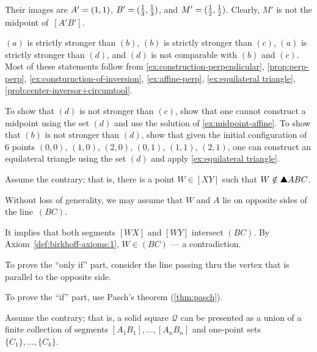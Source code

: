 Their images are $A'=(1,1)$, $B'=(\tfrac13,\tfrac13)$, and $M'=(\tfrac12,\tfrac12)$.
Clearly, $M'$ is not the midpoint of~$[A'B']$.


$(a)$ is strictly stronger than $(b)$,
$(b)$ is strictly stronger than $(c)$,
$(a)$ is strictly stronger than $(d)$,
and $(d)$ is not comparable with $(b)$ and $(c)$.
Most of these statements follow from \ref{ex:construction-perpendicular},
\ref{prop:perp-perp},
\ref{ex:consturuction-of-inversion},
\ref{ex:affine-perp},
\ref{ex:equilateral triangle}, 
\ref{prob:center-inversor+circumtool}.

To show that $(d)$ is not stronger than $(c)$, show that one cannot construct a midpoint using the set $(d)$ and use the solution of \ref{ex:midpoint-affine}.
To show that $(b)$ is not stronger than $(d)$, show that given the initial configuration of 6 points 
$(0,0)$, 
$(1,0)$,
$(2,0)$,
$(0,1)$, 
$(1,1)$,
$(2,1)$,
one can construct an equilateral triangle using the set $(d)$ and apply \ref{ex:equilateral triangle}.

\setcounter{eqtn}{0} 

Assume the contrary; 
that is, there is a point $W\in [XY]$ such that $W\notin\solidtriangle ABC$.

Without  loss of generality, we may assume that $W$ and $A$ lie on opposite sides of the line~$(BC)$.

It implies that both segments $[WX]$ and $[WY]$ intersect $(BC)$.
By Axiom~\ref{def:birkhoff-axioms:1}, $W\in (BC)$ --- a contradiction.


To prove the ``only if'' part, consider the line passing thru the vertex that is parallel to the opposite side.

To prove the ``if'' part, use Pasch's theorem (\ref{thm:pasch}).

Assume the contrary; that is, a solid square $\mathcal{Q}$ can be presented as a union of a finite collection of segments $[A_1B_1],\dots,[A_nB_n]$
and one-point sets $\{C_1\},\dots,\{C_k\}$.

